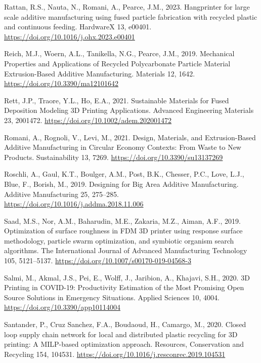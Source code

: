 \documentclass[
  12pt,
]{article}
\newlength{\cslhangindent}
\newlength{\cslentryspacingunit} %
\newenvironment{CSLReferences}[2] %
 {%
  \setlength{\parindent}{0pt}
  \ifodd #1
  \let\oldpar\par
  \def\par{\hangindent=\cslhangindent\oldpar}
  \fi
  \setlength{\parskip}{#2\cslentryspacingunit}
 }%
 {}
\begin{document}
\begin{CSLReferences}{1}{0}
\leavevmode{}%
Rattan, R.S., Nauta, N., Romani, A., Pearce, J.M., 2023. Hangprinter for
large scale additive manufacturing using fused particle fabrication with
recycled plastic and continuous feeding. HardwareX 13, e00401.
\url{https://doi.org/10.1016/j.ohx.2023.e00401}

\leavevmode{}%
Reich, M.J., Woern, A.L., Tanikella, N.G., Pearce, J.M., 2019.
Mechanical {Properties} and {Applications} of {Recycled Polycarbonate
Particle Material Extrusion-Based Additive Manufacturing}. Materials 12,
1642. \url{https://doi.org/10.3390/ma12101642}

\leavevmode{}%
Rett, J.P., Traore, Y.L., Ho, E.A., 2021. Sustainable {Materials} for
{Fused Deposition Modeling 3D Printing Applications}. Advanced
Engineering Materials 23, 2001472.
\url{https://doi.org/10.1002/adem.202001472}

\leavevmode{}%
Romani, A., Rognoli, V., Levi, M., 2021. Design, {Materials}, and
{Extrusion-Based Additive Manufacturing} in {Circular Economy Contexts}:
{From Waste} to {New Products}. Sustainability 13, 7269.
\url{https://doi.org/10.3390/su13137269}

\leavevmode{}%
Roschli, A., Gaul, K.T., Boulger, A.M., Post, B.K., Chesser, P.C., Love,
L.J., Blue, F., Borish, M., 2019. Designing for {Big Area Additive
Manufacturing}. Additive Manufacturing 25, 275--285.
\url{https://doi.org/10.1016/j.addma.2018.11.006}

\leavevmode{}%
Saad, M.S., Nor, A.M., Baharudin, M.E., Zakaria, M.Z., Aiman, A.F.,
2019. Optimization of surface roughness in {FDM 3D} printer using
response surface methodology, particle swarm optimization, and symbiotic
organism search algorithms. The International Journal of Advanced
Manufacturing Technology 105, 5121--5137.
\url{https://doi.org/10.1007/s00170-019-04568-3}

\leavevmode{}%
Salmi, M., Akmal, J.S., Pei, E., Wolff, J., Jaribion, A., Khajavi, S.H.,
2020. {3D Printing} in {COVID-19}: {Productivity Estimation} of the
{Most Promising Open Source Solutions} in {Emergency Situations}.
Applied Sciences 10, 4004. \url{https://doi.org/10.3390/app10114004}

\leavevmode{}%
Santander, P., Cruz Sanchez, F.A., Boudaoud, H., Camargo, M., 2020.
Closed loop supply chain network for local and distributed plastic
recycling for {3D} printing: A {MILP-based} optimization approach.
Resources, Conservation and Recycling 154, 104531.
\url{https://doi.org/10.1016/j.resconrec.2019.104531}


\end{CSLReferences}
\end{document}

